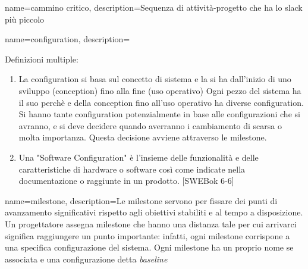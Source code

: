 {
name=cammino critico,
description={Sequenza di attivit\`a-progetto che ha lo slack pi\`u piccolo}
}

{
name=configuration,
description={Definizioni multiple:
\begin{enumerate}
\item La configuration si basa sul concetto di sistema e la si ha dall'inizio di uno sviluppo (conception) fino alla fine (uso operativo) Ogni pezzo del sistema ha il suo perch\`e e della conception fino all'uso operativo ha diverse configuration. Si hanno tante configuration  potenzialmente in base alle configurazioni che si avranno, e si deve decidere quando averranno i cambiamento di scarsa o molta importanza. Questa decisione avviene attraverso le milestone.
\item Una "Software Configuration" \`e l'insieme delle funzionalit\`a e delle caratteristiche di hardware o software cos\`i come indicate nella documentazione o raggiunte in un prodotto. [SWEBok 6-6]
\end{enumerate}
}
}




{
name=milestone,
description={Le milestone servono per fissare dei punti di avanzamento significativi rispetto agli obiettivi stabiliti e al tempo a disposizione.
Un progettatore assegna milestone che hanno una distanza tale per cui arrivarci significa raggiungere un punto importante: infatti, ogni milestone corrispone a una specifica configurazione del sistema.
Ogni milestone ha un proprio nome se associata e una configurazione detta \textit{baseline}}
}

